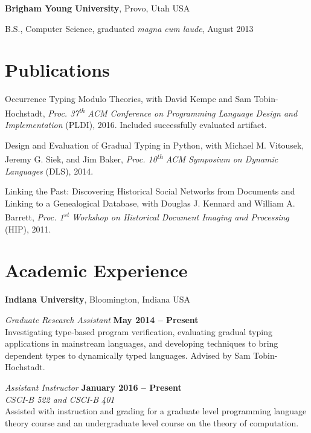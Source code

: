 \documentclass[margin,line]{res}
\newcommand{\ts}{\textsuperscript}
\newenvironment{list1}{
  \begin{list}{\ding{113}}{%
      \setlength{\itemsep}{0in}
      \setlength{\parsep}{0in} \setlength{\parskip}{0in}
      \setlength{\topsep}{0in} \setlength{\partopsep}{0in} 
      \setlength{\leftmargin}{0.17in}}}{\end{list}}
\begin{document}
\begin{resume}
{\bf Brigham Young University}, Provo, Utah USA\\
\vspace*{-.1in}
\begin{list1}
\item[] B.S., Computer Science, graduated \emph{magna cum laude}, August 2013
\end{list1}

\section{\sc Publications}

Occurrence Typing Modulo Theories, with David Kempe and Sam
Tobin-Hochstadt, {\em Proc. 37\ts{th} ACM Conference on Programming
  Language Design and Implementation} (PLDI), 2016. Included
successfully evaluated artifact.

Design and Evaluation of Gradual Typing in Python, with Michael
M. Vitousek, Jeremy G. Siek, and Jim Baker, {\em Proc.  10\ts{th} ACM
  Symposium on Dynamic Languages} (DLS), 2014.

Linking the Past: Discovering Historical Social Networks from
Documents and Linking to a Genealogical Database, with Douglas
J. Kennard and William A. Barrett, {\em Proc. 1\ts{st} Workshop on
  Historical Document Imaging and Processing} (HIP), 2011.

%

\section{\sc Academic Experience}
{\bf Indiana University}, Bloomington, Indiana USA

\vspace{-.3cm}
{\em Graduate Research Assistant} \hfill {\bf May 2014 -- Present}\\
Investigating type-based program verification, evaluating gradual
typing applications in mainstream languages, and developing techniques
to bring dependent types to dynamically typed languages. Advised by
Sam Tobin-Hochstadt.

{\em Assistant Instructor} \hfill {\bf January 2016 -- Present}\\ {\em
  CSCI-B 522 and CSCI-B 401}\\ Assisted with instruction and grading for a
graduate level programming language theory course and an undergraduate
level course on the theory of computation.


\end{resume}
\end{document}

